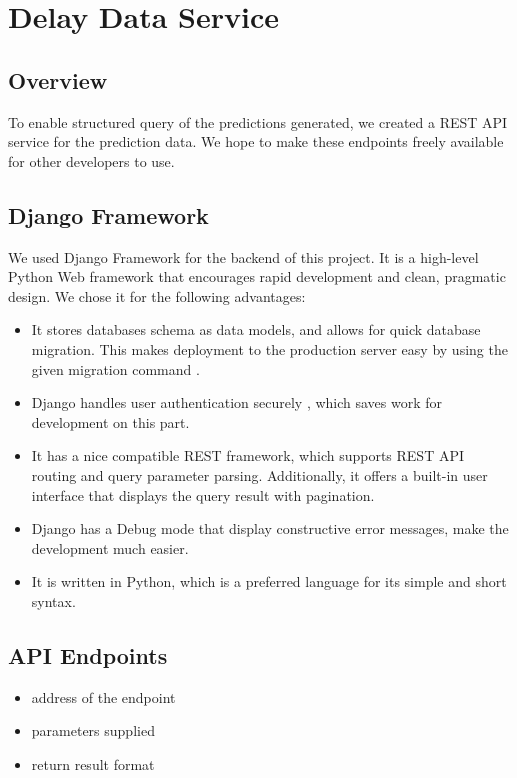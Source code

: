 \chapter{Delay Data Service}

\section{Overview}
To enable structured query of the predictions generated, we created a REST API service for the prediction data. We hope to make these endpoints freely available for other developers to use.

\section{Django Framework}
\par We used Django Framework\cite{django_framework} for the backend of this project. It is a high-level Python Web framework that encourages rapid development and clean, pragmatic design. We chose it for the following advantages:

\begin{itemize}
  \item It stores databases schema as data models\cite{django_model}, and allows for quick database migration. This makes deployment to the production server easy by using the given migration command \cite{django_migrations}.
  \item Django handles user authentication securely \cite{django_user_auth}, which saves work for development on this part.
  \item It has a nice compatible REST framework\cite{django_rest}, which supports REST API routing\cite{django_rest_routing} and query parameter parsing. Additionally, it offers a built-in user interface that displays the query result with pagination\cite{django_rest_pagination}.
  \item Django has a Debug mode that display constructive error messages, make the development much easier.
  \item It is written in Python, which is a preferred language for its simple and short syntax.
\end{itemize}

\section{API Endpoints}
\begin{itemize}
  \item address of the endpoint
  \item parameters supplied
  \item return result format
\end{itemize}

